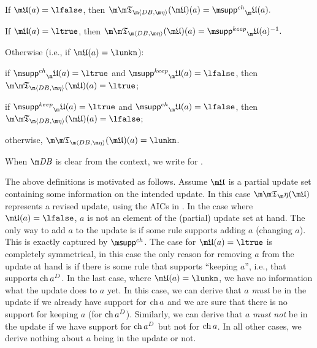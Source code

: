 \begin{definition}
\begin{compactitem}
 \item If $\UUU(a)=\lfalse$, then $\Apfull(\UUU)(a) = \suppin_\UUU(a).$
 \item If $\UUU(a)=\ltrue$, then $\Apfull(\UUU)(a) = \suppout_\UUU(a)^{-1}.$
 \item Otherwise (i.e., if $\UUU(a) = \lunkn$):
  \begin{compactitem}
    \item if $\suppin_\UUU(a) = \ltrue$ and $\suppout_\UUU(a)=\lfalse$, then $\Apfull(\UUU)(a)=\ltrue$;
    \item if $\suppout_\UUU(a) = \ltrue$ and $\suppin_\UUU(a)=\lfalse$, then $\Apfull(\UUU)(a)=\lfalse$;
    \item otherwise, $\Apfull(\UUU)(a)=\lunkn$.
\end{compactitem}

\end{compactitem}
When $\db$ is clear from the context, we write \Ap for \Apfull.
 
\end{definition}

The above definitions is motivated as follows. Assume $\UUU$ is a partial update set containing some information on the intended update. In this case $\Ap(\UUU)$ represents a revised update, using the AICs in \aics. 
In the case where $\UUU(a)=\lfalse$, $a$ is not an element of the (partial) update set at hand. The only way to add $a$ to the update is if some rule supports adding $a$ (changing $a$). This is exactly captured by $\suppin$. 
The case for $\UUU(a)=\ltrue$ is completely symmetrical, in this case the only reason for removing $a$ from the update at hand is if there is some rule that supports ``keeping $a$'', i.e., that supports $\operatorname{ch} a^D$. 
In the last case, where $\UUU(a)=\lunkn$, we have no information what the update does to $a$ yet. In this case, we can derive that $a$ \emph{must} be in the update if we already have support for $\operatorname{ch} a$ and we are sure that there is no support for keeping $a$ (for $\operatorname{ch} a^D$). Similarly, we can derive that $a$ \emph{must not} be in the update if we have support for $\operatorname{ch} a^D$ but not for $\operatorname{ch} a$. 
In all other cases, we derive nothing about $a$ being in the update or not. 


